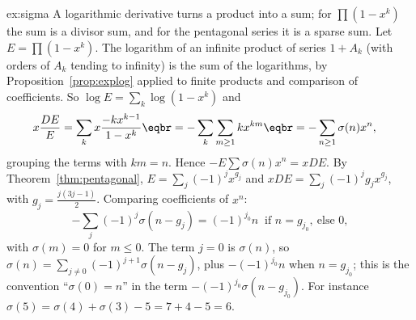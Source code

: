 \begin{solution}{ex:sigma}
\idea A logarithmic derivative turns a product into a sum; for $\prod(1-x^k)$ the sum is a divisor sum, and for the
pentagonal series it is a sparse sum.
\writeup Let $E=\prod(1-x^k)$. The logarithm of an infinite product of series $1+A_k$ (with orders of $A_k$ tending to
infinity) is the sum of the logarithms, by Proposition~\ref{prop:explog} applied to finite products and comparison of
coefficients. So $\log E=\sum_k\log(1-x^k)$ and
\[
\begin{aligned}x\frac{DE}E&=\sum_kx\frac{-kx^{k-1}}{1-x^k}\eqbr=-\sum_k\sum_{m\ge1}kx^{km}\eqbr=-\sum_{n\ge1}\sigma(n)x^n,\end{aligned}
\]
grouping the terms with $km=n$. Hence $-E\sum\sigma(n)x^n=xDE$. By Theorem~\ref{thm:pentagonal}, $E=\sum_j(-1)^jx^{g_j}$ and
$xDE=\sum_j(-1)^jg_jx^{g_j}$, with $g_j=\frac{j(3j-1)}2$. Comparing coefficients of $x^n$:
\[
-\sum_j(-1)^j\sigma(n-g_j)=(-1)^{j_0}n\ \text{ if }n=g_{j_0},\ \text{else }0,
\]
with $\sigma(m)=0$ for $m\le0$. The term $j=0$ is $\sigma(n)$, so $\sigma(n)=\sum_{j\ne0}(-1)^{j+1}\sigma(n-g_j)$, plus $-(-1)^{j_0}n$
when $n=g_{j_0}$; this is the convention ``$\sigma(0)=n$'' in the term $-(-1)^{j_0}\sigma(n-g_{j_0})$. For instance $\sigma(5)=\sigma(4)+\sigma(3)-5=7+4-5=6$.
\end{solution}

